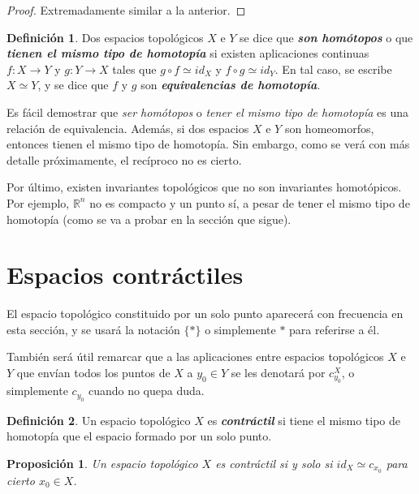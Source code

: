\documentclass[11pt]{report}
\newenvironment{cdefinition} %
  {\begin{mdframed}[innertopmargin = 0pt,
                    innerbottommargin = 7.5pt,
                    backgroundcolor = lightgray!10,
                    linewidth = 1pt,
                    shadow = true,
                    shadowsize = 5pt,
                    roundcorner = 0pt,
                    skipabove = 0pt]
    \begin{definition}}
  {\end{definition}\end{mdframed}}
\newtheorem{proposition}{Proposición}[chapter]
\theoremstyle{definition}
\newtheorem{definition}{Definición}[chapter]
\theoremstyle{definition}
\theoremstyle{remark}
\newcommand{\R}{\mathbb R}
\begin{document}
\begin{proof}
Extremadamente similar a la anterior.
\end{proof}

\begin{cdefinition}
Dos espacios topológicos $X$ e $Y$ se dice que \textbf{\textit{son homótopos}} o que \textbf{\textit{tienen el mismo tipo de homotopía}} si existen aplicaciones continuas $f \colon X \to Y$ y $g \colon Y \to X$ tales que $g \circ f \simeq id_X$ y $f \circ g \simeq id_Y$. En tal caso, se escribe $X \simeq Y$, y se dice que $f$ y $g$ son \textbf{\textit{equivalencias de homotopía}}.
\end{cdefinition}

Es fácil demostrar que \textit{ser homótopos} o \textit{tener el mismo tipo de homotopía} es una relación de equivalencia. Además, si dos espacios $X$ e $Y$ son homeomorfos, entonces tienen el mismo tipo de homotopía. Sin embargo, como se verá con más detalle próximamente, el recíproco no es cierto. 

\vspace{2mm}

Por último, existen invariantes topológicos que no son invariantes homotópicos. Por ejemplo, $\R^n$ no es compacto y un punto sí, a pesar de tener el mismo tipo de homotopía (como se va a probar en la sección que sigue).

\section{Espacios contráctiles}

El espacio topológico constituido por un solo punto aparecerá con frecuencia en esta sección, y se usará la notación $\{\ast\}$ o simplemente $\ast$ para referirse a él. 

\vspace{2mm}

También será útil remarcar que a las aplicaciones entre espacios topológicos $X$ e $Y$ que envían todos los puntos de $X$ a $y_0 \in Y$ se les denotará por $c_{y_0}^X$, o simplemente $c_{y_0}$ cuando no quepa duda.

\hfill

\begin{cdefinition}
    Un espacio topológico $X$ es \textbf{\textit{contráctil}} si tiene el mismo tipo de homotopía que el espacio formado por un solo punto.
\end{cdefinition}

\begin{proposition}
    Un espacio topológico $X$ es contráctil si y solo si $id_X \simeq c_{x_0}$ para cierto $x_0 \in X$.
\end{proposition}
\end{document}
